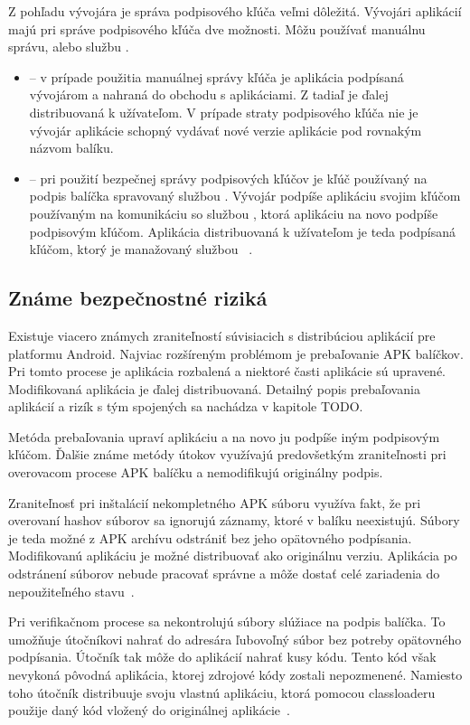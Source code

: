 Z pohľadu vývojára je správa podpisového kľúča veľmi dôležitá. Vývojári aplikácií majú pri správe podpisového kľúča dve možnosti. Môžu používať manuálnu správu, alebo službu . 
\begin{itemize}
	\item {} -- v prípade použitia manuálnej správy kľúča je aplikácia podpísaná vývojárom a nahraná do obchodu s aplikáciami. Z tadiaľ je ďalej distribuovaná k užívateľom. V prípade straty podpisového kľúča nie je vývojár aplikácie schopný vydávať nové verzie aplikácie pod rovnakým názvom balíku.
	\item {} -- pri použití bezpečnej správy podpisových kľúčov  je kľúč používaný na podpis balíčka spravovaný službou  . Vývojár podpíše aplikáciu svojim kľúčom používaným na komunikáciu so službou  , ktorá aplikáciu na novo podpíše podpisovým kľúčom. Aplikácia distribuovaná k užívateľom je teda podpísaná kľúčom, ktorý je manažovaný službou ~\cite{NT0FrzQIkOAYbG2G}. 
\end{itemize}


\subsection{Známe bezpečnostné riziká}

Existuje viacero známych zraniteľností súvisiacich s distribúciou aplikácií  pre platformu Android. Najviac rozšíreným problémom je prebaľovanie APK balíčkov. Pri tomto procese je aplikácia rozbalená a niektoré časti aplikácie sú upravené. Modifikovaná aplikácia je ďalej distribuovaná. Detailný popis prebaľovania aplikácií a rizík s tým spojených sa nachádza v kapitole TODO.

Metóda prebaľovania upraví aplikáciu a na novo ju podpíše iným podpisovým kľúčom. Ďalšie známe metódy útokov využívajú predovšetkým zraniteľnosti pri overovacom procese APK balíčku a nemodifikujú originálny podpis. 

Zraniteľnosť pri inštalácií nekompletného APK súboru využíva fakt, že pri overovaní hashov súborov sa ignorujú záznamy, ktoré v balíku neexistujú. Súbory je teda možné z APK archívu odstrániť bez jeho opätovného podpísania. Modifikovanú aplikáciu je možné distribuovať ako originálnu verziu. Aplikácia po odstránení súborov nebude pracovať správne a môže dostať celé zariadenia do nepoužiteľného stavu~\cite{A7idcou1z6WqKvQZ}.

Pri verifikačnom procese sa nekontrolujú súbory slúžiace na podpis balíčka. To umožňuje útočníkovi nahrať do adresára  ľubovoľný súbor bez potreby opätovného podpísania. Útočník tak môže do aplikácií nahrať kusy kódu. Tento kód však nevykoná pôvodná aplikácia, ktorej zdrojové kódy zostali nepozmenené. Namiesto toho útočník distribuuje svoju vlastnú aplikáciu, ktorá pomocou classloaderu použije daný kód vložený do originálnej aplikácie~\cite{A7idcou1z6WqKvQZ}.
